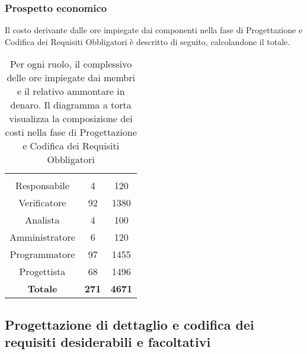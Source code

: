 \subsubsection{Prospetto economico}
Il costo derivante dalle ore impiegate dai componenti nella fase di Progettazione e Codifica dei Requisiti Obbligatori è descritto di seguito, calcolandone il totale.

\begin{table}[H]
	{\setlength{\parindent}{0cm}
		\begin{minipage}{.43\textwidth}
			\begin{tabular}{ccc}
				\rowcolorhead
				\headertitle{Ruolo} & \headertitle{Ore} & \headertitle{Costo(€)}\\
				Responsabile & 4 & 120\\
				Verificatore & 92 & 1380\\
				Analista & 4 & 100\\
				Amministratore & 6 & 120\\
				Programmatore & 97 & 1455\\
				Progettista & 68 & 1496\\
				\hline
				\textbf{Totale} & \textbf{271} & \textbf{4671}\\
			\end{tabular}
		\end{minipage}%
		\begin{minipage}{.57\textwidth}
	\end{minipage} }
	\caption[Prospetto economico della fase di Progettazione e Codifica dei Requisiti Obbligatori]{Per ogni ruolo, il complessivo delle ore impiegate dai membri e il relativo ammontare in denaro. Il diagramma a torta visualizza la composizione dei costi nella fase di Progettazione e Codifica dei Requisiti Obbligatori}
\end{table}





\subsection{Progettazione di dettaglio e codifica dei requisiti desiderabili e facoltativi}



